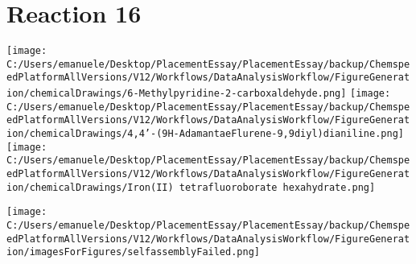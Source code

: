 \documentclass{article}%
\begin{document}
\section*{Reaction 16}%
%
\begin{scheme}[H]%
\begin{minipage}{0.5\textwidth}%
\texttt{[image: C:/Users/emanuele/Desktop/PlacementEssay/PlacementEssay/backup/ChemspeedPlatformAllVersions/V12/Workflows/DataAnalysisWorkflow/FigureGeneration/chemicalDrawings/6-Methylpyridine-2-carboxaldehyde.png]}%
\texttt{[image: C:/Users/emanuele/Desktop/PlacementEssay/PlacementEssay/backup/ChemspeedPlatformAllVersions/V12/Workflows/DataAnalysisWorkflow/FigureGeneration/chemicalDrawings/4,4'-(9H-AdamantaeFlurene-9,9diyl)dianiline.png]}%
\texttt{[image: C:/Users/emanuele/Desktop/PlacementEssay/PlacementEssay/backup/ChemspeedPlatformAllVersions/V12/Workflows/DataAnalysisWorkflow/FigureGeneration/chemicalDrawings/Iron(II) tetrafluoroborate hexahydrate.png]}%
\end{minipage}%
\begin{minipage}{0.5\textwidth}%
\begin{center}%
\texttt{[image: C:/Users/emanuele/Desktop/PlacementEssay/PlacementEssay/backup/ChemspeedPlatformAllVersions/V12/Workflows/DataAnalysisWorkflow/FigureGeneration/imagesForFigures/selfassemblyFailed.png]}%
\end{center}%
\end{minipage}%
\caption{Self-assembly of components 8, 13, with Iron(II) in a 3.0:1.5:1.0 molar ratio in CH$_3$CN at 60\textdegree C for 40h. These are the reagents (starting materials) for reaction 16.}%
\end{scheme}%
\end{document}
